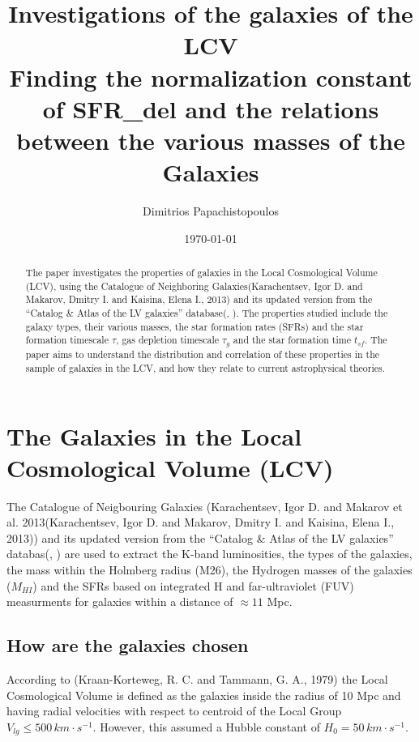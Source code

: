 \documentclass[a4paper]{article}
\author{Dimitrios Papachistopoulos}
\date{\today}
\title{Investigations of the galaxies of the LCV\\\medskip
\large Finding the normalization constant of SFR_{del} and the relations between the various masses of the Galaxies}
\begin{document}
\maketitle

\begin{abstract}
The paper investigates the properties of galaxies in the Local Cosmological Volume (LCV), using the Catalogue of Neighboring Galaxies(Karachentsev, Igor D. and Makarov, Dmitry I. and Kaisina, Elena I., 2013) and its updated version from the ``Catalog \& Atlas of the LV galaxies'' database(, ). The properties studied include the galaxy types, their various masses, the star formation rates (SFRs) and the star formation timescale \(\tau\), gas depletion timescale \(\tau_g\) and the star formation time \(t_{sf}\). The paper aims to understand the distribution and correlation of these properties in the sample of galaxies in the LCV, and how they relate to current astrophysical theories.
\end{abstract}

\section{The Galaxies in the Local Cosmological Volume (LCV)}
\label{sec:orga2f0b32}

The Catalogue of Neigbouring Galaxies (Karachentsev, Igor D. and Makarov  et al. 2013(Karachentsev, Igor D. and Makarov, Dmitry I. and Kaisina, Elena I., 2013)) and its updated version from the ``Catalog \& Atlas of the LV galaxies'' databas(, )  are used to extract the K-band luminosities, the types of the galaxies, the mass within the Holmberg radius (M26), the Hydrogen masses of the galaxies (\(M_{HI}\)) and the SFRs based on integrated  H and far-ultraviolet (FUV) measurments for galaxies within a distance of \(\approx 11\) Mpc.

\subsection{How are the galaxies chosen}
\label{sec:orgde10150}

According to (Kraan-Korteweg, R. C. and Tammann, G. A., 1979) the Local Cosmological Volume is defined as the galaxies inside the radius of 10 Mpc and having radial velocities with respect to centroid of the Local Group \(V_{lg} \le 500 \, km \cdot s^{-1}\). However, this assumed a Hubble constant of \(H_0 = 50\, km \cdot s^{-1}\).
\end{document}
